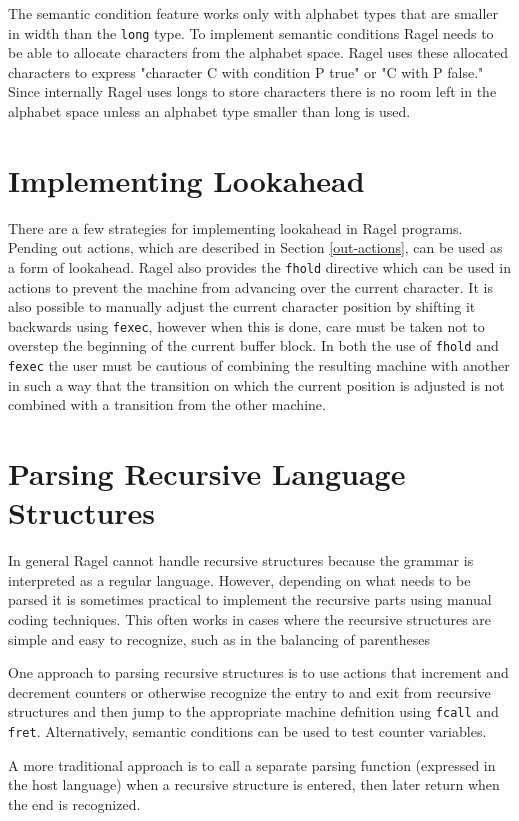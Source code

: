 \documentclass[letterpaper,11pt,oneside]{book}
\begin{document}
\vspace{10pt}

 The semantic condition feature works only with
alphabet types that are smaller in width than the \verb|long| type. To
implement semantic conditions Ragel needs to be able to allocate characters
from the alphabet space. Ragel uses these allocated characters to express
"character C with condition P true" or "C with P false." Since internally Ragel
uses longs to store characters there is no room left in the alphabet space
unless an alphabet type smaller than long is used.

\section{Implementing Lookahead}

There are a few strategies for implementing lookahead in Ragel programs.
Pending out actions, which are described in Section \ref{out-actions}, can be
used as a form of lookahead.  Ragel also provides the \verb|fhold| directive
which can be used in actions to prevent the machine from advancing over the
current character. It is also possible to manually adjust the current character
position by shifting it backwards using \verb|fexec|, however when this is
done, care must be taken not to overstep the beginning of the current buffer
block. In both the use of \verb|fhold| and \verb|fexec| the user must be
cautious of combining the resulting machine with another in such a way that the
transition on which the current position is adjusted is not combined with a
transition from the other machine.

\section{Parsing Recursive Language Structures}

In general Ragel cannot handle recursive structures because the grammar is
interpreted as a regular language. However, depending on what needs to be
parsed it is sometimes practical to implement the recursive parts using manual
coding techniques. This often works in cases where the recursive structures are
simple and easy to recognize, such as in the balancing of parentheses

One approach to parsing recursive structures is to use actions that increment
and decrement counters or otherwise recognize the entry to and exit from
recursive structures and then jump to the appropriate machine defnition using
\verb|fcall| and \verb|fret|. Alternatively, semantic conditions can be used to
test counter variables.

A more traditional approach is to call a separate parsing function (expressed
in the host language) when a recursive structure is entered, then later return
when the end is recognized.
\end{document}
